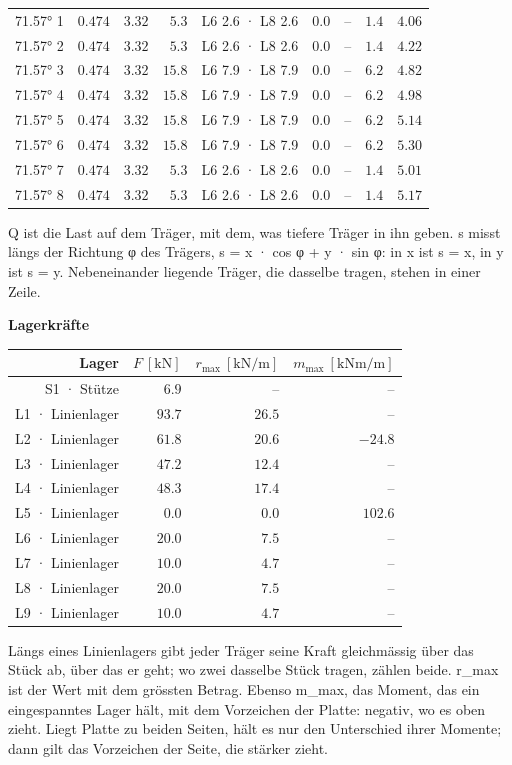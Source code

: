 \documentclass[11pt,a4paper]{article}
\begin{document}
\begin{longtable}{rrrrrrrrr}
71.57° 1 & $0.474$ & $3.32$ & $5.3$ & L6 2.6 · L8 2.6 & $0.0$ & – & $1.4$ & $4.06$ \\
71.57° 2 & $0.474$ & $3.32$ & $5.3$ & L6 2.6 · L8 2.6 & $0.0$ & – & $1.4$ & $4.22$ \\
71.57° 3 & $0.474$ & $3.32$ & $15.8$ & L6 7.9 · L8 7.9 & $0.0$ & – & $6.2$ & $4.82$ \\
71.57° 4 & $0.474$ & $3.32$ & $15.8$ & L6 7.9 · L8 7.9 & $0.0$ & – & $6.2$ & $4.98$ \\
71.57° 5 & $0.474$ & $3.32$ & $15.8$ & L6 7.9 · L8 7.9 & $0.0$ & – & $6.2$ & $5.14$ \\
71.57° 6 & $0.474$ & $3.32$ & $15.8$ & L6 7.9 · L8 7.9 & $0.0$ & – & $6.2$ & $5.30$ \\
71.57° 7 & $0.474$ & $3.32$ & $5.3$ & L6 2.6 · L8 2.6 & $0.0$ & – & $1.4$ & $5.01$ \\
71.57° 8 & $0.474$ & $3.32$ & $5.3$ & L6 2.6 · L8 2.6 & $0.0$ & – & $1.4$ & $5.17$ \\
\hline
\end{longtable}
Q ist die Last auf dem Träger, mit dem, was tiefere Träger in ihn geben. s misst längs der Richtung φ des Trägers, s = x · cos φ + y · sin φ: in x ist s = x, in y ist s = y. Nebeneinander liegende Träger, die dasselbe tragen, stehen in einer Zeile.

\noindent\textbf{Lagerkräfte}
\begin{longtable}{rrrr}
\hline
Lager & $F\ [\mathrm{kN}]$ & $r_{\max}\ [\mathrm{kN/m}]$ & $m_{\max}\ [\mathrm{kNm/m}]$ \\
\hline
\endhead
S1 · Stütze & $6.9$ & – & – \\
L1 · Linienlager & $93.7$ & $26.5$ & – \\
L2 · Linienlager & $61.8$ & $20.6$ & $-24.8$ \\
L3 · Linienlager & $47.2$ & $12.4$ & – \\
L4 · Linienlager & $48.3$ & $17.4$ & – \\
L5 · Linienlager & $0.0$ & $0.0$ & $102.6$ \\
L6 · Linienlager & $20.0$ & $7.5$ & – \\
L7 · Linienlager & $10.0$ & $4.7$ & – \\
L8 · Linienlager & $20.0$ & $7.5$ & – \\
L9 · Linienlager & $10.0$ & $4.7$ & – \\
\hline
\end{longtable}
Längs eines Linienlagers gibt jeder Träger seine Kraft gleichmässig über das Stück ab, über das er geht; wo zwei dasselbe Stück tragen, zählen beide. r\_max ist der Wert mit dem grössten Betrag. Ebenso m\_max, das Moment, das ein eingespanntes Lager hält, mit dem Vorzeichen der Platte: negativ, wo es oben zieht. Liegt Platte zu beiden Seiten, hält es nur den Unterschied ihrer Momente; dann gilt das Vorzeichen der Seite, die stärker zieht.
\end{document}
